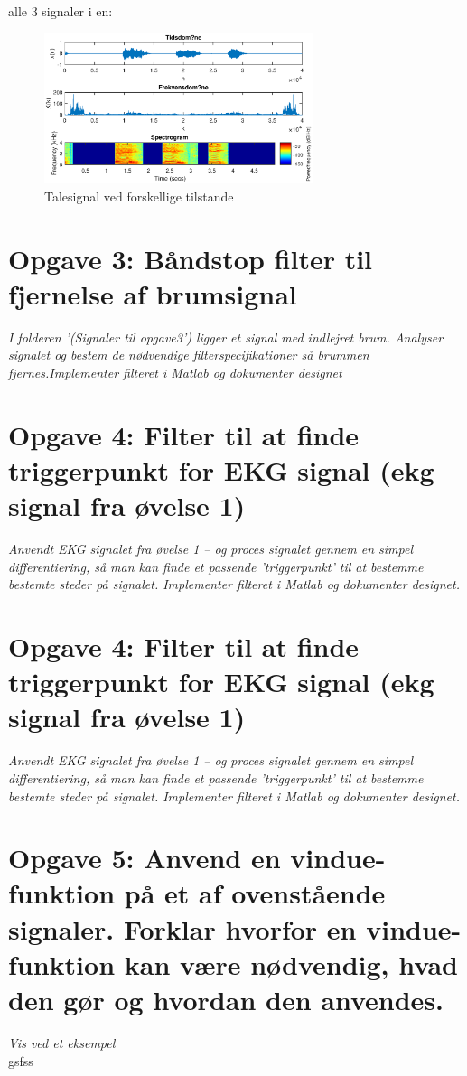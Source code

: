 \documentclass[a4paper]{report}
\begin{document}
alle 3 signaler i en: 


\begin{figure}[H] 
\centering
\includegraphics[width=0.7\textwidth]{grafer/opg2_all}
\caption{Talesignal ved forskellige tilstande} \label{opg2_all}
\end{figure}



\section*{Opgave 3: Båndstop filter til fjernelse af brumsignal}

\textit{I folderen '(Signaler til opgave3') ligger et signal med indlejret brum. Analyser signalet og bestem de nødvendige filterspecifikationer så brummen fjernes.Implementer filteret i Matlab og dokumenter designet}\\

\section*{Opgave 4: Filter til at finde triggerpunkt for EKG signal (ekg signal fra øvelse 1)}
\textit{Anvendt EKG signalet fra øvelse 1 – og proces signalet gennem en simpel  differentiering, så man kan finde et passende ’triggerpunkt’ til at bestemme bestemte steder på signalet. Implementer filteret i Matlab og dokumenter designet.}\\

\section*{Opgave 4: Filter til at finde triggerpunkt for EKG signal (ekg signal fra øvelse 1)}
\textit{Anvendt EKG signalet fra øvelse 1 – og proces signalet gennem en simpel  differentiering, så man kan finde et passende ’triggerpunkt’ til at bestemme bestemte steder på signalet. Implementer filteret i Matlab og dokumenter designet.
}\\

\section*{Opgave 5: Anvend en vindue-funktion på et af ovenstående signaler. Forklar hvorfor en vindue-funktion kan være nødvendig, hvad den gør og hvordan den anvendes.}
\textit{Vis ved et eksempel}\\


gsfss
\end{document}

